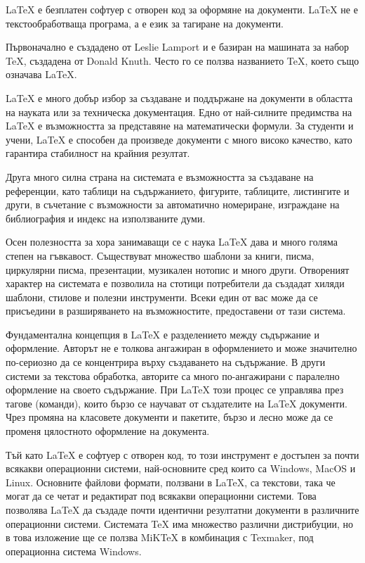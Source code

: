 LaTeX е безплатен софтуер с отворен код за оформяне на документи. LaTeX не е текстообработваща програма, а е език за тагиране на документи.

Първоначално е създадено от Leslie Lamport и е базиран на машината за набор TeX, създадена от Donald Knuth. Често го се ползва названието TeX, което също означава LaTeX.

LaTeX е много добър избор за създаване и поддържане на документи в областта на науката или за техническа документация. Едно от най-силните предимства на LaTeX е възможността за представяне на математически формули. За студенти и учени, LaTeX е способен да произведе документи с много високо качество, като гарантира стабилност на крайния резултат.

Друга много силна страна на системата е възможността за създаване на референции, като таблици на съдържанието, фигурите, таблиците, листингите и други, в съчетание с възможности за автоматично номериране, изграждане на библиография и индекс на използваните думи.

Осен полезността за хора занимаващи се с наука LaTeX дава и много голяма степен на гъвкавост. Съществуват множество шаблони за книги, писма, циркулярни писма, презентации, музикален нотопис и много други. Отвореният характер на системата е позволила на стотици потребители да създадат хиляди шаблони, стилове и полезни инструменти. Всеки един от вас може да се присъедини в разширяването на възможностите, предоставени от тази система.

Фундаментална концепция в LaTeX е разделението между съдържание и оформление. Авторът не е толкова ангажиран в оформлението и може значително по-сериозно да се концентрира върху създаването на съдържание. В други системи за текстова обработка, авторите са много по-ангажирани с паралелно оформление на своето съдържание. При LaTeX този процес се управлява през тагове (команди), които бързо се научават от създателите на LaTeX документи. Чрез промяна на класовете документи и пакетите, бързо и лесно може да се променя цялостното оформление на документа.

Тъй като LaTeX е софтуер с отворен код, то този инструмент е достъпен за почти всякакви операционни системи, най-основните сред които са Windows, MacOS и Linux. Основните файлови формати, ползвани в LaTeX, са текстови, така че могат да се четат и редактират под всякакви операционни системи. Това позволява LaTeX да създаде почти идентични резултатни документи в различните операционни системи. Системата TeX има множество различни дистрибуции, но в това изложение ще се ползва MiKTeX в комбинация с Texmaker, под операционна система Windows. 


